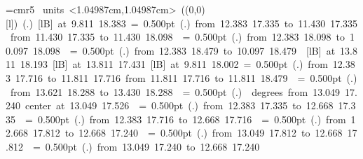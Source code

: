 \font\thinlinefont=cmr5
%
\begingroup\makeatletter\ifx\SetFigFont\undefined%
\gdef\SetFigFont#1#2#3#4#5{%
  \reset@font\fontsize{#1}{#2pt}%
  \fontfamily{#3}\fontseries{#4}\fontshape{#5}%
  \selectfont}%
\fi\endgroup%
\mbox{\beginpicture
\setcoordinatesystem units <1.04987cm,1.04987cm>
\unitlength=1.04987cm
\linethickness=1pt
\setplotsymbol ({\makebox(0,0)[l]{\tencirc{}}})
\setshadesymbol ({\thinlinefont .})
\setlinear
%
%
 [lB] at  9.811 18.383
%
%
\linethickness= 0.500pt
\setplotsymbol ({\thinlinefont .})
{\color[rgb]{0,0,0}\putrule from 12.383 17.335 to 11.430 17.335
\putrule from 11.430 17.335 to 11.430 18.098
}%
%
%
\linethickness= 0.500pt
\setplotsymbol ({\thinlinefont .})
{\color[rgb]{0,0,0}\putrule from 12.383 18.098 to 10.097 18.098
}%
%
%
\linethickness= 0.500pt
\setplotsymbol ({\thinlinefont .})
{\color[rgb]{0,0,0}\putrule from 12.383 18.479 to 10.097 18.479
}%
%
%
 [lB] at 13.811 18.193
%
%
 [lB] at 13.811 17.431
%
%
 [lB] at  9.811 18.002
%
%
\linethickness= 0.500pt
\setplotsymbol ({\thinlinefont .})
{\color[rgb]{0,0,0}\putrule from 12.383 17.716 to 11.811 17.716
\putrule from 11.811 17.716 to 11.811 18.479
}%
%
%
\linethickness= 0.500pt
\setplotsymbol ({\thinlinefont .})
{\color[rgb]{0,0,0}\putrule from 13.621 18.288 to 13.430 18.288
}%
%
%
\linethickness= 0.500pt
\setplotsymbol ({\thinlinefont .})
{\color[rgb]{0,0,0} degrees from 13.049 17.240 center at 13.049 17.526
}%
%
%
\linethickness= 0.500pt
\setplotsymbol ({\thinlinefont .})
{\color[rgb]{0,0,0}\putrule from 12.383 17.335 to 12.668 17.335
}%
%
%
\linethickness= 0.500pt
\setplotsymbol ({\thinlinefont .})
{\color[rgb]{0,0,0}\putrule from 12.383 17.716 to 12.668 17.716
}%
%
%
\linethickness= 0.500pt
\setplotsymbol ({\thinlinefont .})
{\color[rgb]{0,0,0}\putrule from 12.668 17.812 to 12.668 17.240
}%
%
%
\linethickness= 0.500pt
\setplotsymbol ({\thinlinefont .})
{\color[rgb]{0,0,0}\putrule from 13.049 17.812 to 12.668 17.812
}%
%
%
\linethickness= 0.500pt
\setplotsymbol ({\thinlinefont .})
{\color[rgb]{0,0,0}\putrule from 13.049 17.240 to 12.668 17.240
}}
